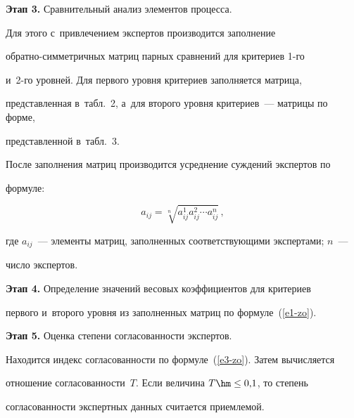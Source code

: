       \textbf{Этап 3.} Сравнительный анализ элементов процесса.

      

      Для этого с~привлечением экспертов производится заполнение 

      обрат\-но-сим\-мет\-рич\-ных матриц парных сравнений для критериев 1-го 

      и~2-го уровней. Для первого уровня критериев заполняется матрица, 

      представленная в~табл.~2, а~для второго уровня критериев~--- матрицы по форме, 

      представленной в~табл.~3.

      

      После заполнения матриц производится усреднение суждений экспертов по 

формуле:

      \begin{equation}

      a_{ij}= \sqrt[n]{a_{ij}^1 a_{ij}^2\cdots a_{ij}^n}\,,

      \label{e6-zo}

      \end{equation}

где $a_{ij}$~--- элементы матриц, заполненных соответствующими экспертами; $n$~--- 

число экспертов.



      \smallskip

      

      \textbf{Этап 4.} Определение значений весовых коэффициентов для критериев 

первого и~второго уровня из заполненных матриц по формуле~(\ref{e1-zo}).

      

      \smallskip

      

      \textbf{Этап 5.} Оценка степени согласованности экспертов. 

      

      Находится индекс согласованности по формуле~(\ref{e3-zo}). Затем вычисляется 

отношение согласованности~$T$. Если величина $T\hm\leq 0{,}1$, то степень 

согласованности экспертных данных считается приемлемой.

      

      \smallskip

      

